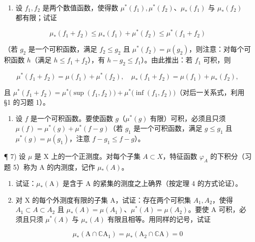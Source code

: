 \begin{enumerate}
\def\labelenumi{\alph{enumi})}
\setcounter{enumi}{3}
\tightlist
\item
  设 \(f_{1}, f_{2}\) 是两个数值函数，使得数 \(\mu^{*}(f_{1}), \mu^{*}(f_{2})\)、\(\mu_{*}(f_{1})\) 与 \(\mu_{*}(f_{2})\) 都有限；试证
\end{enumerate}

\[
\mu_ {*} (f _ {1} + f _ {2}) \leqslant \mu_ {*} (f _ {1}) + \mu^ {*} (f _ {2}) \leqslant \mu^ {*} (f _ {1} + f _ {2})
\]

（若 \(g_2\) 是一个可积函数，满足 \(f_2 \leqslant g_2\) 且 \(\mu^*(f_2) = \mu(g_2)\)，则注意：对每个可积函数 \(h\)（满足 \(h \leqslant f_1 + f_2\)），有 \(h - g_2 \leqslant f_1\)）。由此推出：若 \(f_1\) 可积，则

\[
\mu^ {*} (f _ {1} + f _ {2}) = \mu (f _ {1}) + \mu^ {*} (f _ {2}), \quad \mu_ {*} (f _ {1} + f _ {2}) = \mu (f _ {1}) + \mu_ {*} (f _ {2}),
\]

且 \(\mu^{*}(f_{1} + f_{2}) = \mu^{*}\big(\sup (f_{1},f_{2})\big) + \mu^{*}\big(\inf (f_{1},f_{2})\big)\)（对后一关系式，利用 §1 的习题 1）。

\begin{enumerate}
\def\labelenumi{\alph{enumi})}
\setcounter{enumi}{4}
\tightlist
\item
  设 \(f\) 是一个可积函数。要使函数 \(g\)（\(\mu^{*}(g)\) 有限）可积，必须且只须 \(\mu(f) = \mu^{*}(g) + \mu^{*}(f - g)\)（若 \(g_{1}\) 是一个可积函数，满足 \(g \leqslant g_{1}\) 且 \(\mu^{*}(g) = \mu(g_{1})\)，注意 \(f - g_{1} \leqslant f - g\)）。
\end{enumerate}

¶ 7) 设 \(\mu\) 是 X 上的一个正测度。对每个子集 \(A \subset X\)，特征函数 \(\varphi_A\) 的下积分（习题 5）称为 A 的内测度，记作 \(\mu_*(A)\)。

\begin{enumerate}
\def\labelenumi{\alph{enumi})}
\item
  试证：\(\mu_{*}(\mathrm{A})\) 是含于 A 的紧集的测度之上确界（按定理 4 的方式论证）。
\item
  对 X 的每个外测度有限的子集 A，试证：存在两个可积集 \(A_{1}, A_{2}\)，使得 \(A_{1} \subset A \subset A_{2}\) 且 \(\mu_{*}(A) = \mu(A_{1})\)、\(\mu^{*}(A) = \mu(A_{2})\)。要使 A 可积，必须且只须 \(\mu^{*}(A)\) 与 \(\mu_{*}(A)\) 有限且相等。用同样的记号，试证
\end{enumerate}

\[
\mu_ {*} (\mathrm{A} \cap \mathbb {C} \mathrm{A} _ {1}) = \mu_ {*} (\mathrm{A} _ {2} \cap \mathbb {C} \mathrm{A}) = 0
\]


